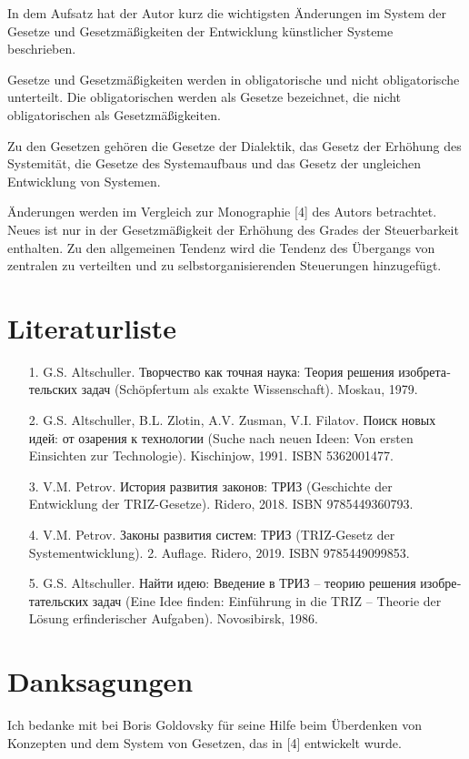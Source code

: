 \documentclass[11pt,a4paper]{article}
\begin{document}
In dem Aufsatz hat der Autor kurz die wichtigsten Änderungen im System der
Gesetze und Gesetzmäßigkeiten der Entwicklung künstlicher Systeme beschrieben.

Gesetze und Gesetzmäßigkeiten werden in obligatorische und nicht
obligatorische unterteilt.  Die obligatorischen werden als Gesetze bezeichnet,
die nicht obligatorischen als Gesetzmäßig\-keiten.

Zu den Gesetzen gehören die Gesetze der Dialektik, das Gesetz der Erhöhung des
Systemität, die Gesetze des Systemaufbaus und das Gesetz der ungleichen
Entwicklung von Systemen.

Änderungen werden im Vergleich zur Monographie [4] des Autors
betrachtet. Neues ist nur in der Gesetzmäßigkeit der Erhöhung des Grades der
Steuerbarkeit enthalten. Zu den allgemeinen Tendenz wird die Tendenz des
Übergangs von zentralen zu verteilten und zu selbstorganisierenden Steuerungen
hinzugefügt.

\section{Literaturliste}
\begin{itemize}
\item[1.] G.S. Altschuller. \foreignlanguage{russian}{Творчество как точная
  наука: Теория решения изобретательских задач} (Schöpfertum als exakte
  Wissenschaft). Moskau, 1979.
\item[2.] G.S. Altschuller, B.L. Zlotin, A.V. Zusman, V.I. Filatov.
  \foreignlanguage{russian}{Поиск новых идей: от озарения к технологии} (Suche
  nach neuen Ideen: Von ersten Einsichten zur Technologie). Kischinjow,
  1991. ISBN 5362001477.
\item[3.] V.M. Petrov. \foreignlanguage{russian}{История развития законов:
  ТРИЗ} (Geschichte der Entwicklung der TRIZ-Gesetze).  Ridero, 2018. ISBN
  9785449360793.
\item[4.] V.M. Petrov. \foreignlanguage{russian}{Законы развития систем: ТРИЗ}
  (TRIZ-Gesetz der Systementwicklung). 2. Auflage. Ridero, 2019.  ISBN
  9785449099853.
\item[5.] G.S. Altschuller. \foreignlanguage{russian}{Найти идею: Введение в
  ТРИЗ – теорию решения изобретательских задач} (Eine Idee finden: Einführung
  in die TRIZ -- Theorie der Lösung erfinderischer Aufgaben).  Novosibirsk,
  1986. 
\end{itemize}

\section{Danksagungen}

Ich bedanke mit bei Boris Goldovsky für seine Hilfe beim Überdenken von
Konzepten und dem System von Gesetzen, das in [4] entwickelt wurde.
\end{document}
